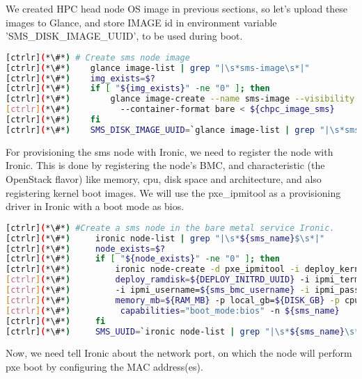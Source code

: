 	We created HPC head node OS image in previous sections, so let's upload these images to Glance, and store IMAGE id in environment variable 'SMS\_DISK\_IMAGE\_UUID', to be used during boot. 

\begin{lstlisting}[language=bash,keywords={}]
[ctrlr](*\#*) # Create sms node image
[ctrlr](*\#*)    glance image-list | grep "|\s*sms-image\s*|"
[ctrlr](*\#*)    img_exists=$?
[ctrlr](*\#*)    if [ "${img_exists}" -ne "0" ]; then
[ctrlr](*\#*)        glance image-create --name sms-image --visibility public --disk-format qcow2 \
[ctrlr](*\#*)          --container-format bare < ${chpc_image_sms}
[ctrlr](*\#*)    fi
[ctrlr](*\#*)    SMS_DISK_IMAGE_UUID=`glance image-list | grep "|\s*sms-image\s*|" | awk '{print $2}'`
\end{lstlisting} 

	For provisioning the sms node with Ironic, we need to register the node with Ironic. This is done by registering the node's BMC, and characteristic (the OpenStack flavor) like memory, cpu, disk space and architecture, and also registering kernel boot images. We will use the pxe\_ipmitool as a provisioning driver in Ironic with a boot mode as bios.


\begin{lstlisting}[language=bash,keywords={}]
[ctrlr](*\#*) #Create a sms node in the bare metal service Ironic.
[ctrlr](*\#*)     ironic node-list | grep "|\s*${sms_name}$\s*|"
[ctrlr](*\#*)     node_exists=$?
[ctrlr](*\#*)     if [ "${node_exists}" -ne "0" ]; then 
[ctrlr](*\#*)         ironic node-create -d pxe_ipmitool -i deploy_kernel=${DEPLOY_VMLINUZ_UUID} -i \
[ctrlr](*\#*)         deploy_ramdisk=${DEPLOY_INITRD_UUID} -i ipmi_terminal_port=8023 -i ipmi_address=${sms_bmc} \
[ctrlr](*\#*)         -i ipmi_username=${sms_bmc_username} -i ipmi_password=${sms_bmc_password} -p cpus=${CPU} -p \
[ctrlr](*\#*)         memory_mb=${RAM_MB} -p local_gb=${DISK_GB} -p cpu_arch=${ARCH} -p \
[ctrlr](*\#*)          capabilities="boot_mode:bios" -n ${sms_name}
[ctrlr](*\#*)     fi
[ctrlr](*\#*)     SMS_UUID=`ironic node-list | grep "|\s*${sms_name}\s*|" | awk '{print $2}'`
\end{lstlisting} 

	Now, we need tell Ironic about the network port, on which the node will perform pxe boot by configuring the MAC address(es). 


